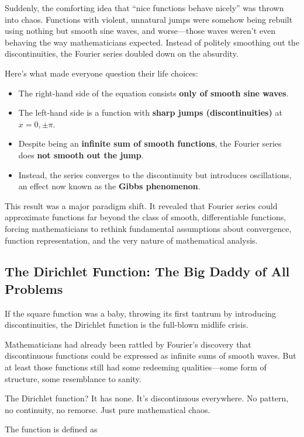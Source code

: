 Suddenly, the comforting idea that “nice functions behave nicely” was thrown into chaos. Functions with violent, unnatural jumps were somehow being rebuilt using nothing but smooth sine waves, and worse—those waves weren’t even behaving the way mathematicians expected. Instead of politely smoothing out the discontinuities, the Fourier series doubled down on the absurdity.

Here’s what made everyone question their life choices:

\begin{itemize}
    \item The right-hand side of the equation consists \textbf{only of smooth sine waves}.
    \item The left-hand side is a function with \textbf{sharp jumps (discontinuities)} at \( x = 0, \pm \pi \).
    \item Despite being an \textbf{infinite sum of smooth functions}, the Fourier series does \textbf{not smooth out the jump}.
    \item Instead, the series converges to the discontinuity but introduces oscillations, an effect now known as the \textbf{Gibbs phenomenon}.
\end{itemize}

This result was a major paradigm shift. It revealed that Fourier series could approximate functions far beyond the class of smooth, differentiable functions, forcing mathematicians to rethink fundamental assumptions about convergence, function representation, and the very nature of mathematical analysis.

\subsection{The Dirichlet Function: The Big Daddy of All Problems}

If the square function was a baby, throwing its first tantrum by introducing discontinuities, the Dirichlet function is the full-blown midlife crisis. 

Mathematicians had already been rattled by Fourier's discovery that discontinuous functions could be expressed as infinite sums of smooth waves. But at least those functions still had some redeeming qualities—some form of structure, some resemblance to sanity. 

The Dirichlet function? It has none. It’s discontinuous everywhere. No pattern, no continuity, no remorse. Just pure mathematical chaos.

The function is defined as

